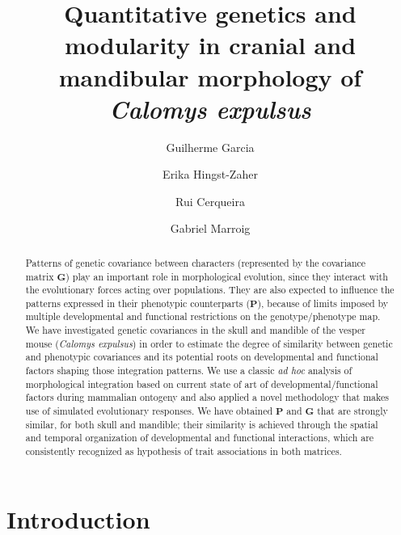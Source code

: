 \documentclass [twocolumn, natbib, nospthms, 10pt] {svjour3}
\title {
  Quantitative genetics and modularity in cranial and mandibular
  morphology of \emph{Calomys expulsus}
}
\author {
  Guilherme Garcia \and Erika Hingst-Zaher \and Rui Cerqueira \and 
  Gabriel Marroig
}
\institute {
  G. Garcia \and G. Marroig \at
  Laboratório de Evolução de Mamíferos \\
  Departamento de Genética e Biologia Evolutiva \\
  Instituto de Biociências, Universidade de São Paulo \\
  São Paulo, SP, Brasil \\ 
  \email{wgar@usp.br}
  \and
  R. Cerqueira \at
  Laboratório de Vertebrados, Departamento de Ecologia, \\
  Instituto de Biologia, Universidade Federal do Rio de Janeiro \\
  Rio de Janeiro, RJ, Brasil. \\ 
  \and
  E. Hingst-Zaher \at
  Museu Biológico, Instituto Butantan \\
  São Paulo, SP, Brasil. \\
}
\begin{document}
\newcommand{\upperline}{\hline\noalign{\smallskip}}
\newcommand{\innerline}{\noalign{\smallskip}\upperline}
\newcommand{\lowerline}{\noalign{\smallskip}\hline}
\newcommand{\modsubline}{\noalign{\smallskip}\cline{2-10}\noalign{\smallskip}}
\newcommand{\compsublineseven}{\noalign{\smallskip}\cline{2-7}\noalign{\smallskip}}
\newcommand{\compsublinesix}{\noalign{\smallskip}\cline{2-6}\noalign{\smallskip}}
\newcommand{\vc}{\boldsymbol}

\maketitle

\begin{abstract}

  Patterns of genetic covariance between characters (represented by
  the covariance matrix $\vc{G}$) play an important role in
  morphological evolution, since they interact with the evolutionary
  forces acting over populations. They are also expected to influence
  the patterns expressed in their phenotypic counterparts ($\vc{P}$),
  because of limits imposed by multiple developmental and functional
  restrictions on the genotype/phenotype map. We have investigated
  genetic covariances in the skull and mandible of the vesper mouse
  (\emph{Calomys expulsus}) in order to estimate the degree of
  similarity between genetic and phenotypic covariances and its
  potential roots on developmental and functional factors shaping
  those integration patterns. We use a classic \emph{ad hoc} analysis
  of morphological integration based on current state of art of
  developmental/functional factors during mammalian ontogeny and also
  applied a novel methodology that makes use of simulated evolutionary
  responses. We have obtained $\vc{P}$ and $\vc{G}$ that are strongly
  similar, for both skull and mandible; their similarity is achieved
  through the spatial and temporal organization of developmental and
  functional interactions, which are consistently recognized as
  hypothesis of trait associations in both matrices.

\end{abstract}


\section {Introduction}
\end{document}
